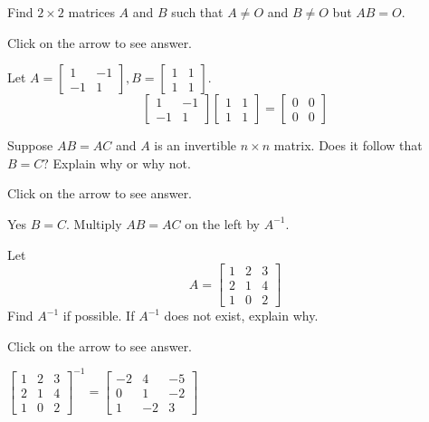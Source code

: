 \documentclass{ximera}
\begin{document}
\begin{problem}\label{prb:4.18} Find $2 \times 2$ matrices $A$ and $B$ such that $A \neq O$ and $B \neq O$ but $AB = O$.

Click on the arrow to see answer.
\begin{expandable}{}{}
Let $A = \left[
\begin{array}{rr}
1 & -1 \\
-1 & 1
\end{array}
\right], B = \left[
\begin{array}{cc}
1 & 1 \\
1 & 1
\end{array}
\right].$
\[
\left[
\begin{array}{rr}
1 & -1 \\
-1 & 1
\end{array}
\right] \left[
\begin{array}{cc}
1 & 1 \\
1 & 1
\end{array}
\right] = \left[
\begin{array}{cc}
0 & 0 \\
0 & 0
\end{array}
\right]
\]
\end{expandable}
\end{problem}

\begin{problem}\label{prb:4.32} Suppose $AB=AC$ and $A$ is an invertible $n\times n$ matrix. Does it
follow that $B=C?$ Explain why or why not.

Click on the arrow to see answer.
\begin{expandable}{}{}
Yes $B=C$. Multiply $AB = AC$ on the left by $A^{-1}$.
\end{expandable}
\end{problem}

\begin{problem}\label{prb:4.40}Let
\begin{equation*}
A=\left[
\begin{array}{rrr}
1 & 2 & 3 \\
2 & 1 & 4 \\
1 & 0 & 2
\end{array}
\right]
\end{equation*}
Find $A^{-1}$ if possible. If $A^{-1}$ does not exist, explain why.

Click on the arrow to see answer.
\begin{expandable}{}{}
$\left[
\begin{array}{ccc}
1 & 2 & 3 \\
2 & 1 & 4 \\
1 & 0 & 2
\end{array}
\right]^{-1}= \left[
\begin{array}{rrr}
-2 & 4 & -5 \\
0 & 1 & -2 \\
1 & -2 & 3
\end{array}
\right]$
\end{expandable}
\end{problem}
\end{document}
